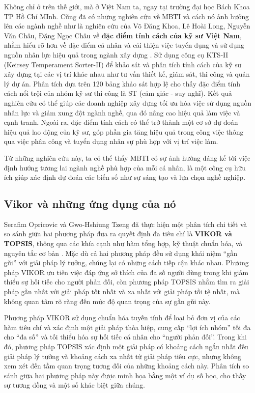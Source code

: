 Không chỉ ở trên thế giới, mà ở Việt Nam ta, ngay tại trường đại học Bách Khoa TP Hồ Chí MInh. Cũng đã có những nghiên cứu về MBTI và cách nó ảnh hưởng lên các ngành nghề như là nghiên cứu của Võ Đăng Khoa, Lê Hoài Long, Nguyễn Văn Châu, Đặng Ngọc Châu về \textbf{đặc điểm tính cách của kỹ sư Việt Nam}, nhằm hiểu rõ hơn về đặc điểm cá nhân và cải thiện việc tuyển dụng và sử dụng nguồn nhân lực hiệu quả trong ngành xây dựng \cite{khoa}.  Sử dụng công cụ KTS-II (Keirsey Temperament Sorter-II) để khảo sát và phân tích tính cách của kỹ sư xây dựng tại các vị trí khác nhau như tư vấn thiết kế, giám sát, thi công và quản lý dự án. Phân tích dựa trên 120 bảng khảo sát hợp lệ cho thấy đặc điểm tính cách nổi trội của nhóm kỹ sư thi công là ST (cảm giác - suy nghĩ). Kết quả nghiên cứu có thể giúp các doanh nghiệp xây dựng tối ưu hóa việc sử dụng nguồn nhân lực và giảm xung đột ngành nghề, qua đó nâng cao hiệu quả làm việc và cạnh tranh. Ngoài ra, đặc điểm tính cách có thể trở thành một cơ sở dự đoán hiệu quả lao động của kỹ sư, góp phần gia tăng hiệu  quả trong công việc thông qua việc phân công và tuyển dụng nhân sự phù hợp với vị trí việc làm.

Từ những nghiên cứu này, ta có thể thấy MBTI có sự ảnh hưởng đáng kế tới việc định hướng tương lai ngành nghề phù hợp của mỗi cá nhân, là một công cụ hữu ích giúp xác định dự đoán các biến số như sự sáng tạo và lựa chọn nghề nghiệp.

\subsection{Vikor và những ứng dụng của nó}
Serafim Opricovic và Gwo-Hshiung Tzeng đã thực hiện một phân tích chi tiết và so sánh giữa hai phương pháp đưa ra quyết định đa tiêu chí là \textbf{VIKOR và TOPSIS}, thông qua các khía cạnh như hàm tổng hợp, kỹ thuật chuẩn hóa, và nguyên tắc cơ bản \cite{serafim}. Mặc dù cả hai phương pháp đều sử dụng khái niệm “gần gũi” với giải pháp lý tưởng, chúng lại có những cách tiếp cận khác nhau. Phương pháp VIKOR ưu tiên việc đáp ứng sở thích của đa số người dùng trong khi giảm thiểu sự hối tiếc cho người phản đối, còn phương pháp TOPSIS nhằm tìm ra giải pháp gần nhất với giải pháp tốt nhất và xa nhất với giải pháp tồi tệ nhất, mà không quan tâm rõ ràng đến mức độ quan trọng của sự gần gũi này.

Phương pháp VIKOR sử dụng chuẩn hóa tuyến tính để loại bỏ đơn vị của các hàm tiêu chí và xác định một giải pháp thỏa hiệp, cung cấp “lợi ích nhóm” tối đa cho “đa số” và tối thiểu hóa sự hối tiếc cá nhân cho “người phản đối”. Trong khi đó, phương pháp TOPSIS xác định một giải pháp có khoảng cách ngắn nhất đến giải pháp lý tưởng và khoảng cách xa nhất từ giải pháp tiêu cực, nhưng không xem xét đến tầm quan trọng tương đối của những khoảng cách này. Phân tích so sánh giữa hai phương pháp này được minh họa bằng một ví dụ số học, cho thấy sự tương đồng và một số khác biệt giữa chúng.

